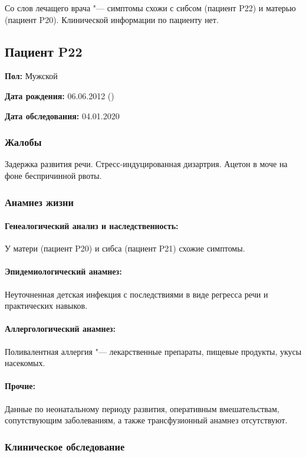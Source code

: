 \documentclass[a4paper,14pt]{extarticle}
\begin{document}
Со слов лечащего врача "--- симптомы схожи с сибсом (пациент P22) и матерью (пациент P20).
Клинической информации по пациенту нет.

\newpage
\subsection*{Пациент P22}

\textbf{Пол:} Мужской

\textbf{Дата рождения:} 06.06.2012 ()

\textbf{Дата обследования:} 04.01.2020

\subsubsection*{Жалобы}

Задержка развития речи.
Стресс-индуцированная дизартрия.
Ацетон в моче на фоне беспричинной рвоты.

\subsubsection*{Анамнез жизни}

\paragraph{Генеалогический анализ и наследственность:} У матери (пациент P20) и сибса (пациент P21) схожие симптомы.

\paragraph{Эпидемиологический анамнез:} Неуточненная детская инфекция с последствиями в виде регресса речи и практических навыков.

\paragraph{Аллергологический анамнез:} Поливалентная аллергия "--- лекарственные препараты, пищевые продукты, укусы насекомых.

\paragraph{Прочие:} Данные по неонатальному периоду развития, оперативным вмешательствам, сопутствующим заболеваниям, а также трансфузионный анамнез отсутствуют.

\subsubsection*{Клиническое обследование}
\end{document}
